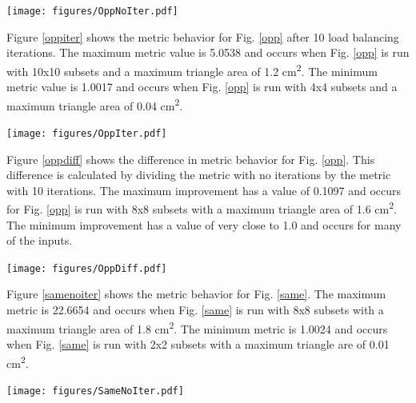 \noindent\begin{minipage}{\textwidth}
\centering
\texttt{[image: figures/OppNoIter.pdf]}
\label{oppnoiter}
\end{minipage}
\smallskip

Figure \ref{oppiter} shows the metric behavior for Fig. \ref{opp} after 10 load balancing iterations. The maximum metric value is 5.0538 and occurs when Fig. \ref{opp} is run with 10x10 subsets and a maximum triangle area of 1.2 cm\textsuperscript{2}. The minimum metric value is 1.0017 and occurs when Fig. \ref{opp} is run with 4x4 subsets and a maximum triangle area of 0.04 cm\textsuperscript{2}.

\noindent\begin{minipage}{\textwidth}
\centering
\texttt{[image: figures/OppIter.pdf]}
\label{oppiter}
\end{minipage}
\smallskip

Figure \ref{oppdiff} shows the difference in metric behavior for Fig. \ref{opp}. This difference is calculated by dividing the metric with no iterations by the metric with 10 iterations. The maximum improvement has a value of 0.1097 and occurs for Fig. \ref{opp} is run with 8x8 subsets with a maximum triangle area of 1.6 cm\textsuperscript{2}. The minimum improvement has a value of very close to 1.0 and occurs for many of the inputs. 

\noindent\begin{minipage}{\textwidth}
\centering
\texttt{[image: figures/OppDiff.pdf]}
\label{oppdiff}
\end{minipage}
\smallskip

Figure \ref{samenoiter} shows the metric behavior for Fig. \ref{same}. The maximum metric is 22.6654 and occurs when Fig. \ref{same} is run with 8x8 subsets with a maximum triangle area of 1.8 cm\textsuperscript{2}. The minimum metric is 1.0024 and occurs when Fig. \ref{same} is run with 2x2 subsets with a maximum triangle are of 0.01 cm\textsuperscript{2}.

\noindent\begin{minipage}{\textwidth}
\centering
\texttt{[image: figures/SameNoIter.pdf]}
\label{samenoiter}
\end{minipage}
\smallskip

